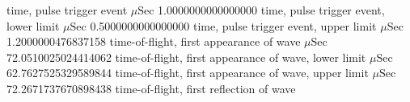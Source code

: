 \expandafter\def\csname oct2tex.air_d25_v800_P.t0.d\endcsname{time, pulse trigger event}
\expandafter\def\csname oct2tex.air_d25_v800_P.t0.u\endcsname{\ensuremath{\mu\text{Sec}}}
\expandafter\def\csname oct2tex.air_d25_v800_P.t0.v\endcsname{1.0000000000000000}
\expandafter\def\csname oct2tex.air_d25_v800_P.t0a.d\endcsname{time, pulse trigger event, lower limit}
\expandafter\def\csname oct2tex.air_d25_v800_P.t0a.u\endcsname{\ensuremath{\mu\text{Sec}}}
\expandafter\def\csname oct2tex.air_d25_v800_P.t0a.v\endcsname{0.5000000000000000}
\expandafter\def\csname oct2tex.air_d25_v800_P.t0b.d\endcsname{time, pulse trigger event, upper limit}
\expandafter\def\csname oct2tex.air_d25_v800_P.t0b.u\endcsname{\ensuremath{\mu\text{Sec}}}
\expandafter\def\csname oct2tex.air_d25_v800_P.t0b.v\endcsname{1.2000000476837158}
\expandafter\def\csname oct2tex.air_d25_v800_P.t1.d\endcsname{time-of-flight, first appearance of wave}
\expandafter\def\csname oct2tex.air_d25_v800_P.t1.u\endcsname{\ensuremath{\mu\text{Sec}}}
\expandafter\def\csname oct2tex.air_d25_v800_P.t1.v\endcsname{72.0510025024414062}
\expandafter\def\csname oct2tex.air_d25_v800_P.t1a.d\endcsname{time-of-flight, first appearance of wave, lower limit}
\expandafter\def\csname oct2tex.air_d25_v800_P.t1a.u\endcsname{\ensuremath{\mu\text{Sec}}}
\expandafter\def\csname oct2tex.air_d25_v800_P.t1a.v\endcsname{62.7627525329589844}
\expandafter\def\csname oct2tex.air_d25_v800_P.t1b.d\endcsname{time-of-flight, first appearance of wave, upper limit}
\expandafter\def\csname oct2tex.air_d25_v800_P.t1b.u\endcsname{\ensuremath{\mu\text{Sec}}}
\expandafter\def\csname oct2tex.air_d25_v800_P.t1b.v\endcsname{72.2671737670898438}
\expandafter\def\csname oct2tex.air_d25_v800_P.t2.d\endcsname{time-of-flight, first reflection of wave}

